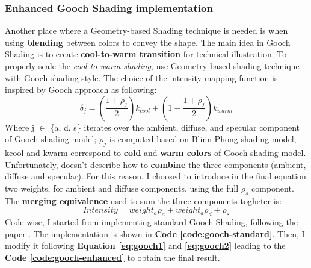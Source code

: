 \subsubsection{Enhanced Gooch Shading implementation}
Another place where a Geometry-based Shading technique is needed is when using \textbf{blending} between colors to convey the shape. The main idea in Gooch Shading is to create \textbf{cool-to-warm transition} for technical illustration. \newline
To properly scale the \textit{cool-to-warm shading}, \cite{referencePaper} use Geometry-based shading technique with Gooch shading style. The choice of the intensity mapping function is inspired by Gooch approach as following:
\begin{equation}\label{eq:gooch1}
	\delta_j = \left(\frac{1+\rho_j}{2}\right)k_{cool} + \left(1-\frac{1+\rho_j}{2}\right)k_{warm}
\end{equation}
Where j $\in$ \{a, d, s\} iterates over the ambient, diffuse, and specular component of Gooch shading model; $\rho_j$ is computed based on Blinn-Phong shading model; kcool and kwarm correspond to \textbf{cold} and \textbf{warm colors} of Gooch shading model. \newline
Unfortunately, \cite{referencePaper} doesn't describe how to \textbf{combine} the three components (ambient, diffuse and specular). For this reason, I choosed to introduce in the final equation two weights, for ambient and diffuse components, using the full $\rho_s$ component. \newline
The \textbf{merging equivalence} used to sum the three components togheter is:
\begin{equation}\label{eq:gooch2}
	Intensity = weight_a\rho_a + weight_d\rho_d + \rho_s
\end{equation}
Code-wise, I started from implementing standard Gooch Shading, following the paper \cite{GoochPaper}. The implementation is shown in \textbf{Code \ref{code:gooch-standard}}. Then, I modify it following \textbf{Equation \ref{eq:gooch1}} and \textbf{\ref{eq:gooch2}} leading to the \textbf{Code \ref{code:gooch-enhanced}} to obtain the final result.
